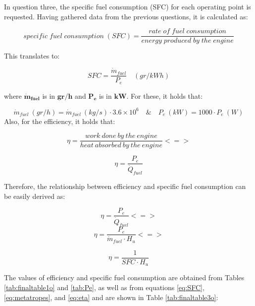 \documentclass{report}
\begin{document}
In question three, the specific fuel consumption (SFC) for each operating point is requested. Having gathered data from the previous questions, it is calculated as:

$$specific\; fuel\; consumption\; (SFC)=\frac{rate\; of\; fuel\; consumption}{energy\; produced\; by\; the\; engine}$$

This translates to:

\begin{equation}
    \label{eq:SFC}
    SFC=\frac{\dot{m}_{fuel}}{P_e}\quad (gr/kWh)
\end{equation}

where $\boldsymbol{\dot{m}_{fuel}}$ is in $\boldsymbol{gr/h}$ and $\boldsymbol{P_e}$ is in $\boldsymbol{kW}$. For these, it holds that:\newline

\begin{equation}
    \label{eq:metatropes}
    \dot{m}_{fuel}\:(gr/h)=\dot{m}_{fuel}\: (kg/s)\cdot 3.6\times 10^6 \quad \&\quad P_e\: (kW)=1000\cdot P_e\: (W)
\end{equation}
\newpage
Also, for the efficiency, it holds that:

$$\eta=\frac{work\: done\: by\: the\: engine}{heat\: absorbed\: by\: the\: engine}<=>$$

\begin{equation}
    \label{eq:eta}
    \eta=\frac{P_e}{\dot{Q}_{fuel}}
\end{equation}

Therefore, the relationship between efficiency and specific fuel consumption can be easily derived as:

$$\eta=\frac{P_e}{\dot{Q}_{fuel}}<=>$$
$$\eta=\frac{P_e}{\dot{m}_{fuel}\cdot H_u}<=>$$

\begin{equation}
    \label{eq:sfc/eta}
    \eta=\frac{1}{SFC\cdot H_u}
\end{equation}

The values of efficiency and specific fuel consumption are obtained from Tables \ref{tab:finaltable1o} and \ref{tab:Pe}, as well as from equations \ref{eq:SFC}, \ref{eq:metatropes}, and \ref{eq:eta} and are shown in Table \ref{tab:finaltable3o}:
\end{document}
